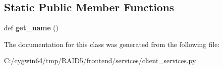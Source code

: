 \subsection*{Static Public Member Functions}
\begin{DoxyCompactItemize}
\item 
\mbox{\label{class_r_a_i_d5_1_1frontend_1_1services_1_1client__services_1_1_client_service_a12e248f08e8568259ff490c8da577f7e}} 
def {\bfseries get\+\_\+name} ()
\end{DoxyCompactItemize}


The documentation for this class was generated from the following file\+:\begin{DoxyCompactItemize}
\item 
C\+:/cygwin64/tmp/\+R\+A\+I\+D5/frontend/services/client\+\_\+services.\+py\end{DoxyCompactItemize}
